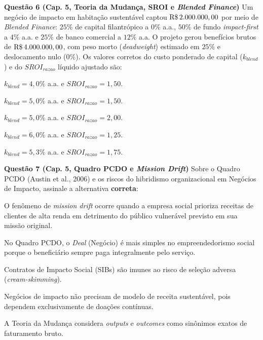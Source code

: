 \textbf{Questão 6 (Cap. 5, Teoria da Mudança, SROI e \textit{Blended Finance})}
Um negócio de impacto em habitação sustentável captou $\text{R\$\,}{2.000.000,00}$ por meio de \textit{Blended Finance}: $25\%$ de capital filantrópico a $0\%$ a.a., $50\%$ de fundo \textit{impact-first} a $4\%$ a.a. e $25\%$ de banco comercial a $12\%$ a.a. O projeto gerou benefícios brutos de $\text{R\$\,}{4.000.000,00}$, com peso morto (\textit{deadweight}) estimado em $25\%$ e deslocamento nulo ($0\%$). Os valores corretos do custo ponderado de capital ($k_{blend}$) e do $SROI_{razao}$ líquido ajustado são:
\begin{alternativas}
  \item $k_{blend} = 4{,}0\%$ a.a. e $SROI_{razao} = 1{,}50$.
  \item $k_{blend} = 5{,}0\%$ a.a. e $SROI_{razao} = 1{,}50$.
  \item $k_{blend} = 5{,}0\%$ a.a. e $SROI_{razao} = 2{,}00$.
  \item $k_{blend} = 6{,}0\%$ a.a. e $SROI_{razao} = 1{,}25$.
  \item $k_{blend} = 5{,}3\%$ a.a. e $SROI_{razao} = 1{,}75$.
\end{alternativas}

\textbf{Questão 7 (Cap. 5, Quadro PCDO e \textit{Mission Drift})}
Sobre o Quadro PCDO (Austin et al., 2006) e os riscos do hibridismo organizacional em Negócios de Impacto, assinale a alternativa \textbf{correta}:
\begin{alternativas}
  \item O fenômeno de \textit{mission drift} ocorre quando a empresa social prioriza receitas de clientes de alta renda em detrimento do público vulnerável previsto em sua missão original.
  \item No Quadro PCDO, o \textit{Deal} (Negócio) é mais simples no empreendedorismo social porque o beneficiário sempre paga integralmente pelo serviço.
  \item Contratos de Impacto Social (SIBs) são imunes ao risco de seleção adversa (\textit{cream-skimming}).
  \item Negócios de impacto não precisam de modelo de receita sustentável, pois dependem exclusivamente de doações contínuas.
  \item A Teoria da Mudança considera \textit{outputs} e \textit{outcomes} como sinônimos exatos de faturamento bruto.
\end{alternativas}

